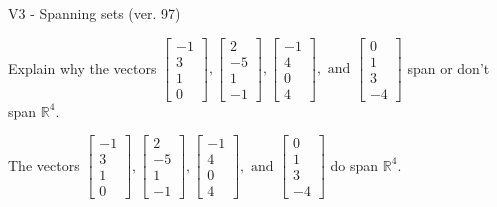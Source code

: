 \begin{exercise}
  \begin{exerciseTitle}V3 - Spanning sets (ver. 97)\end{exerciseTitle}
  \begin{exerciseStatement}
    Explain why the vectors \(\left[\begin{array}{r}
-1 \\
3 \\
1 \\
0
\end{array}\right] , \left[\begin{array}{r}
2 \\
-5 \\
1 \\
-1
\end{array}\right] , \left[\begin{array}{r}
-1 \\
4 \\
0 \\
4
\end{array}\right] , \text{ and } \left[\begin{array}{r}
0 \\
1 \\
3 \\
-4
\end{array}\right]\) span or don't span \(\mathbb{R}^4\). 
	


  \end{exerciseStatement}
  \begin{exerciseAnswer}
   The vectors \(\left[\begin{array}{r}
-1 \\
3 \\
1 \\
0
\end{array}\right] , \left[\begin{array}{r}
2 \\
-5 \\
1 \\
-1
\end{array}\right] , \left[\begin{array}{r}
-1 \\
4 \\
0 \\
4
\end{array}\right] , \text{ and } \left[\begin{array}{r}
0 \\
1 \\
3 \\
-4
\end{array}\right]\) 
  	 do  
	span \(\mathbb{R}^4\).
  


  \end{exerciseAnswer}
\end{exercise}